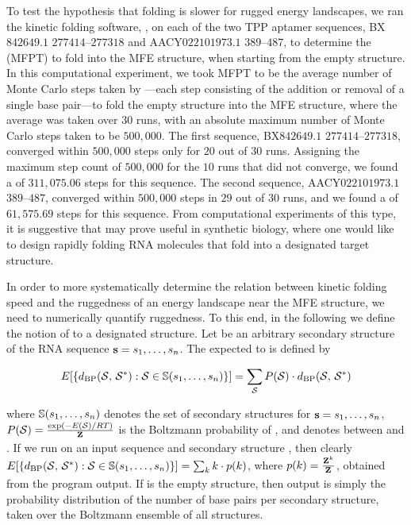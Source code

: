 To test the hypothesis that folding is slower for rugged energy landscapes,
we ran the kinetic folding software, \kinfold \citep{flamm},
on each of the two TPP \rb aptamer sequences,
BX$842649.1$ $277414$--$277318$ and AACY$022101973.1$ $389$--$487$,
to determine the \mfpt (MFPT) to
fold into the MFE structure, when starting from the empty structure.
In this computational
experiment, we took MFPT to be the average number of Monte Carlo steps
taken by \kinfold---each step consisting of the addition or removal
of a single base pair---to fold the
empty structure into the MFE
structure, where the average was taken over $30$ runs, with an absolute
maximum number of Monte Carlo steps taken to be $500,000$.
The first sequence, BX$842649.1$ $277414$--$277318$, converged within $500,000$
steps only for $20$ out of $30$ runs. Assigning the maximum step count of
$500,000$ for the $10$ runs that did not converge, we found a \mfpt
of $311,075.06$ steps for this sequence.
The second sequence, AACY$022101973.1$ $389$--$487$, converged within $500,000$
steps in $29$ out of $30$ runs, and we found a \mfpt of
$61,575.69$ steps for this sequence. From computational experiments of this
type, it is suggestive that \fftbor may prove useful in synthetic
biology,
where one would like to design rapidly folding RNA molecules that
fold into a designated target structure.

In order to more systematically determine the relation between kinetic
folding speed and the ruggedness of an energy landscape near the MFE structure,
we need to numerically quantify ruggedness. To this end, in the following
we define the notion of \ebpd to a designated
structure. Let \strSt be an arbitrary secondary structure of the RNA sequence
${\bf s} = s_1,\dots,s_n$.
The expected \bpd to \strSt is defined by

\begin{align}
E[ \{ d_{\text{BP}}(\mathcal S,\,\mathcal S^*) : \mathcal S \in \mathbb{S}(s_1,\dots,s_n)\} ] =
\sum_{\mathcal S} P(\mathcal S) \cdot d_{\text{BP}}(\mathcal S,\,\mathcal S^*)
\end{align}

where
$\mathbb{S}(s_1,\dots,s_n)$ denotes the set of secondary structures for
${\bf s} = s_1,\dots,s_n$, $P(\mathcal S) = \frac{\exp(-E(\mathcal S)/RT)}{{\bf Z}^{}_{}}$ is the Boltzmann
probability of \str, and
\dBP{\str}{\strSt} denotes \bpd between \str and \strSt.
If we run \fftbor on an input sequence \seq and secondary structure
\strSt, then clearly
$E[ \{ d_{\text{BP}}(\mathcal S,\,\mathcal S^*) : \mathcal S \in \mathbb{S}(s_1,\dots,s_n)\} ] =
\sum_{k} k \cdot p(k)$, where $p(k)=\frac{{\bf Z}^{k}_{}}{{\bf Z}^{}_{}}$, obtained from the
program output.  If \strSt is the empty structure, then \fftbor output
is simply the probability distribution of the number of base pairs per
secondary structure, taken over the Boltzmann ensemble of all structures.

